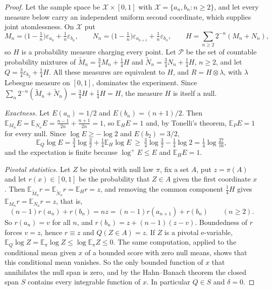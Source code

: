 \documentclass[11pt,a4paper]{article}
\theoremstyle{definition}
\theoremstyle{remark}
\newcommand{\PP}{\mathcal P}
\newcommand{\EE}{\mathbb E}
\newcommand{\pt}{\varepsilon}
\begin{document}
\begin{proof}
Let the sample space be \(\mathcal X\times[0,1]\) with \(\mathcal X=\{a_n,b_n:n\ge2\}\), and let every measure below carry an independent uniform second coordinate, which supplies joint atomlessness. On \(\mathcal X\) put
\[
 M_n=\bigl(1-\tfrac1n\bigr)\pt_{a_n}+\tfrac1n\pt_{b_n},\qquad
 N_n=\bigl(1-\tfrac1n\bigr)\pt_{a_{n+1}}+\tfrac1n\pt_{b_n},\qquad
 H=\sum_{n\ge2}2^{-n}(M_n+N_n),
\]
so \(H\) is a probability measure charging every point. Let \(\PP\) be the set of countable probability mixtures of \(\widetilde M_n=\frac34M_n+\frac14H\) and \(\widetilde N_n=\frac34N_n+\frac14H\), \(n\ge2\), and let \(Q=\frac34\pt_{b_2}+\frac14H\). All these measures are equivalent to \(H\), and \(R=H\otimes\lambda\), with \(\lambda\) Lebesgue measure on \([0,1]\), dominates the experiment. Since \(\sum_n2^{-n}(\widetilde M_n+\widetilde N_n)=\frac34H+\frac14H=H\), the measure \(H\) is itself a null.

\emph{Exactness.} Let \(E(a_n)=1/2\) and \(E(b_n)=(n+1)/2\). Then \(\EE_{M_n}E=\EE_{N_n}E=\frac{n-1}{2n}+\frac{n+1}{2n}=1\), so \(\EE_HE=1\) and, by Tonelli's theorem, \(\EE_PE=1\) for every null. Since \(\log E\ge-\log2\) and \(E(b_2)=3/2\),
\[
 \EE_Q\log E=\tfrac34\log\tfrac32+\tfrac14\EE_H\log E\ \ge\ \tfrac34\log\tfrac32-\tfrac14\log2=\tfrac14\log\tfrac{27}{16},
\]
and the expectation is finite because \(\log^+E\le E\) and \(\EE_HE=1\).

\emph{Pivotal statistics.} Let \(Z\) be pivotal with null law \(\pi\), fix a set \(A\), put \(z=\pi(A)\) and let \(r(x)\in[0,1]\) be the probability that \(Z\in A\) given the first coordinate \(x\). Then \(\EE_{\widetilde M_n}r=\EE_{\widetilde N_n}r=\EE_Hr=z\), and removing the common component \(\frac14H\) gives \(\EE_{M_n}r=\EE_{N_n}r=z\), that is,
\[
 (n-1)r(a_n)+r(b_n)=nz=(n-1)r(a_{n+1})+r(b_n)\qquad(n\ge2).
\]
So \(r(a_n)=v\) for all \(n\), and \(r(b_n)=z+(n-1)(z-v)\). Boundedness of \(r\) forces \(v=z\), hence \(r\equiv z\) and \(Q(Z\in A)=z\). If \(Z\) is a pivotal e-variable, \(\EE_Q\log Z=\EE_\pi\log Z\le\log\EE_\pi Z\le0\). The same computation, applied to the conditional mean given \(x\) of a bounded score with zero null means, shows that this conditional mean vanishes. So the only bounded function of \(x\) that annihilates the null span is zero, and by the Hahn--Banach theorem the closed span \(S\) contains every integrable function of \(x\). In particular \(Q\in S\) and \(\delta=0\).


\end{proof}
\end{document}
